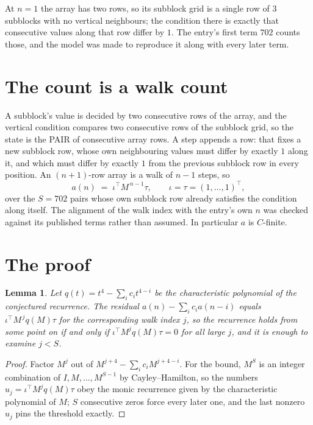 \documentclass[11pt,a4paper]{article}
\theoremstyle{plain}
\newtheorem{lemma}[theorem]{Lemma}
\theoremstyle{definition}
\begin{document}
At $n=1$ the array has two rows, so its subblock grid is a single row of $3$ subblocks with
no vertical neighbours; the condition there is exactly that consecutive values along that row
differ by $1$. The entry's first term $702$ counts those, and the model was made to
reproduce it along with every later term.

\section{The count is a walk count}

A subblock's value is decided by two consecutive rows of the array, and the
vertical condition compares two consecutive rows of the subblock grid, so the state is the
PAIR of consecutive array rows. A step appends a row: that fixes a new subblock row, whose own
neighbouring values must differ by exactly $1$ along it, and which must differ by exactly
$1$ from the previous subblock row in every position. An $(n+1)$-row array is a walk of
$n-1$ steps, so
\[
a(n)\;=\;\iota^{\!\top}M^{\,n-1}\tau,\qquad\iota=\tau=(1,\dots,1)^{\!\top},
\]
over the $S=702$ pairs whose own subblock row already satisfies the condition along itself.
The alignment of the walk index with the entry's own $n$ was checked against its published
terms rather than assumed. In particular $a$ is $C$-finite.

\section{The proof}

\begin{lemma}\label{lem:crit}
Let $q(t)=t^{4}-\sum_i c_it^{4-i}$ be the characteristic polynomial of the
conjectured recurrence. The residual $a(n)-\sum_ic_ia(n-i)$ equals
$\iota^{\!\top}M^{\,j}q(M)\tau$ for the corresponding walk index $j$, so the recurrence
holds from some point on if and only if $\iota^{\!\top}M^{j}q(M)\tau=0$ for all large $j$,
and it is enough to examine $j<S$.
\end{lemma}

\begin{proof}
Factor $M^{j}$ out of $M^{j+4}-\sum_ic_iM^{j+4-i}$. For the bound, $M^{S}$
is an integer combination of $I,M,\dots,M^{S-1}$ by Cayley--Hamilton, so the numbers
$u_j=\iota^{\!\top}M^{j}q(M)\tau$ obey the monic recurrence given by the characteristic
polynomial of $M$; $S$ consecutive zeros force every later one, and the last nonzero $u_j$
pins the threshold exactly.
\end{proof}
\end{document}
